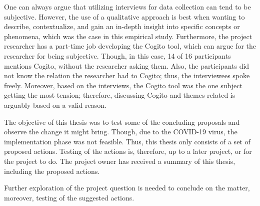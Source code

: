 One can always argue that utilizing interviews for data collection can tend to be subjective. However, the use of a qualitative approach is best when wanting to describe, contextualize, and gain an in-depth insight into specific concepts or phenomena, which was the case in this empirical study. Furthermore, the project researcher has a part-time job developing the Cogito tool, which can argue for the researcher for being subjective. Though, in this case, 14 of 16 participants mentions Cogito, without the researcher asking them. Also, the participants did not know the relation the researcher had to Cogito; thus, the interviewees spoke freely. Moreover, based on the interviews, the Cogito tool was the one subject getting the most tension; therefore, discussing Cogito and themes related is arguably based on a valid reason. 

The objective of this thesis was to test some of the concluding proposals and observe the change it might bring. Though, due to the COVID-19 virus, the implementation phase was not feasible. Thus, this thesis only consists of a set of proposed actions. Testing of the actions is, therefore, up to a later project, or for the project to do. The project owner has received a summary of this thesis, including the proposed actions. 

Further exploration of the project question is needed to conclude on the matter, moreover, testing of the suggested actions.
\cleardoublepage